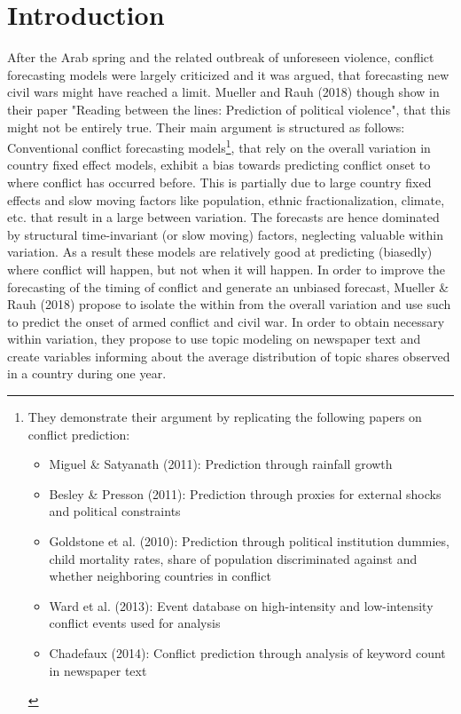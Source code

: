 
\renewcommand{\contentsname}{Table of Contents}
\tableofcontents
\clearpage



\section{Introduction}
After the Arab spring and the related outbreak of unforeseen violence, conflict forecasting models were largely criticized and it was argued, that forecasting new civil wars might have reached a limit. Mueller and Rauh (2018) though show in their paper "Reading between the lines: Prediction of political violence", that this might not be entirely true. Their main argument is structured as follows: Conventional conflict forecasting models\footnote{\noindent They demonstrate their argument by replicating the following papers on conflict prediction: \begin{itemize}
    \item Miguel \& Satyanath (2011): Prediction through rainfall growth
    \item Besley \& Presson (2011): Prediction through proxies for external shocks and political constraints
    \item Goldstone et al. (2010): Prediction through political institution dummies, child mortality rates, share of population discriminated against and whether neighboring countries in conflict
    \item Ward et al. (2013): Event database on high-intensity and low-intensity conflict events used for analysis
    \item Chadefaux (2014): Conflict prediction through analysis of keyword count in newspaper text
\end{itemize}}, that rely on the overall variation in country fixed effect models, exhibit a bias towards predicting conflict onset to where conflict has occurred before. This is partially due to large country fixed effects and slow moving factors like population, ethnic fractionalization, climate, etc. that result in a large between variation. The forecasts are hence dominated by structural time-invariant (or slow moving) factors, neglecting valuable within variation. As a result these models are relatively good at predicting (biasedly) where conflict will happen, but not when it will happen. In order to improve the forecasting of the timing of conflict and generate an unbiased forecast, Mueller \& Rauh (2018) propose to isolate the within from the overall variation and use such to predict the onset of armed conflict and civil war. In order to obtain necessary within variation, they propose to use topic modeling on newspaper text and create variables informing about the average distribution of topic shares observed in a country during one year. 



